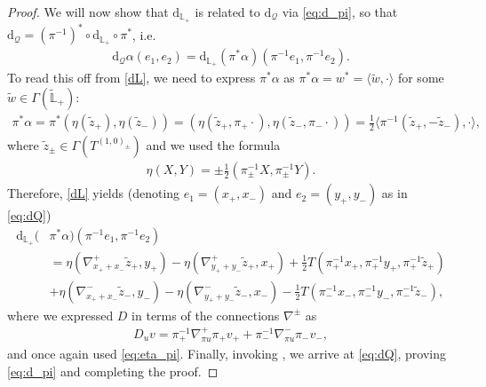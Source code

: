 \documentclass{article}
\newcommand{\QQ}{\mathcal{Q}}
\newcommand{\ap}{\alpha}
\newcommand{\n}{\nabla}
\newcommand{\rd}{\mathrm{d}}
\newcommand{\Lb}{\mathbb{L}}
\newcommand{\se}{\Gamma}
\newcommand{\la}{\langle}
\newcommand{\ra}{\rangle}
\newcommand{\brac}{[\ ,\ ]}
\newcommand{\zt}{\tl{z}}
\def\tl{\tilde}
\theoremstyle{definition}
\theoremstyle{definition}
\theoremstyle{remark}
\begin{document}
\begin{proof}
We will now show that $\rd_{\Lb_+}$ is related to $\rd_\QQ$ via \eqref{eq:d_pi}, so that $\rd_\QQ=(\pi^{-1})^*\circ \rd_{\Lb_+}\circ \pi^*$, i.e.
\begin{align*}
\rd_\QQ\ap(e_1,e_2)=\rd_{\Lb_+}(\pi^*\ap)(\pi^{-1}e_1,\pi^{-1}e_2).
\end{align*}
To read this off from \eqref{dL}, we need to express $\pi^*\ap$ as $\pi^*\ap=w^*=\la \tl{w},\cdot\ra$ for some $\tl{w}\in\se (\tl{\Lb}_+)$:
\begin{align*}
\pi^*\ap=\pi^*(\eta(\zt_+),\eta(\zt_-))=(\eta(\zt_+,\pi_+\cdot),\eta(\zt_-,\pi_-\cdot))=\frac{1}{2}\la\pi^{-1}(\zt_+,-\zt_-),\cdot\ra,
\end{align*}
where $\zt_\pm\in \se(T^{(1,0)_\pm})$ and we used the formula 
\begin{align}\label{eq:eta_pi}
\eta(X,Y)=\pm\frac{1}{2}(\pi_\pm^{-1}X,\pi_\pm^{-1}Y). 
\end{align}
Therefore, \eqref{dL} yields (denoting $e_1=(x_+,x_-)$ and $e_2=(y_+,y_-)$ as in \eqref{eq:dQ})
\begin{align*}
\rd_{\Lb_+}(&\pi^*\ap)(\pi^{-1}e_1,\pi^{-1}e_2)\\
&=\eta(\n^+_{x_++x_-}\zt_+,y_+)-\eta(\n^+_{y_++y_-}\zt_+,x_+)+\frac{1}{2}T(\pi_+^{-1}x_+,\pi_+^{-1}y_+,\pi_+^{-1}\zt_+)\\
&+\eta(\n^-_{x_++x_-}\zt_-,y_-)-\eta(\n^-_{y_++y_-}\zt_-,x_-)-\frac{1}{2}T(\pi_-^{-1}x_-,\pi_-^{-1}y_-,\pi_-^{-1}\zt_-),
\end{align*}
where we expressed $D$ in terms of the connections $\n^\pm$ as
\begin{align*}
D_uv=\pi^{-1}_+\n^+_{\pi u}\pi_+ v_++\pi^{-1}_-\n^-_{\pi u}\pi_- v_-,
\end{align*}
and once again used \eqref{eq:eta_pi}. Finally, invoking \cite[Prop.~2.29]{Hu:2019zro}, we arrive at \eqref{eq:dQ}, proving \eqref{eq:d_pi} and completing the proof.

\end{proof}
\end{document}
